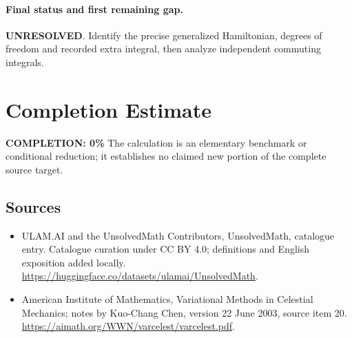 \documentclass[11pt]{article}
\begin{document}
\paragraph{Final status and first remaining gap.}
\textbf{UNRESOLVED}. Identify the precise generalized Hamiltonian, degrees of freedom and recorded extra integral, then analyze independent commuting integrals.

\section{Completion Estimate}
\noindent\textbf{COMPLETION: 0\%}
The calculation is an elementary benchmark or conditional reduction; it establishes no claimed new portion of the complete source target.

\subsection{Sources}
\begin{itemize}
\item[\hypertarget{source:statement:1}{S1}] ULAM.AI and the UnsolvedMath Contributors, UnsolvedMath, catalogue entry. Catalogue curation under CC BY 4.0; definitions and English exposition added locally.
\url{https://huggingface.co/datasets/ulamai/UnsolvedMath}.
\item[\hypertarget{source:statement:2}{S2}] American Institute of Mathematics, Variational Methods in Celestial Mechanics; notes by Kuo-Chang Chen, version 22 June 2003, source item 20.
\url{https://aimath.org/WWN/varcelest/varcelest.pdf}.
\end{itemize}
\label{end:statement}
\end{document}
